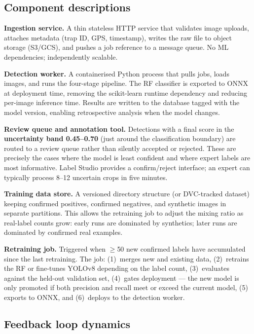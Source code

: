 \documentclass[11pt, a4paper]{article}
\begin{document}
\subsection{Component descriptions}

\textbf{Ingestion service.}
A thin stateless HTTP service that validates image uploads,
attaches metadata (trap ID, GPS, timestamp), writes the raw file to object
storage (S3/GCS), and pushes a job reference to a message queue. No ML
dependencies; independently scalable.

\textbf{Detection worker.}
A containerised Python process that pulls jobs, loads images, and runs the
four-stage pipeline. The RF classifier is exported to ONNX at deployment time,
removing the scikit-learn runtime dependency and reducing per-image inference
time. Results are written to the database tagged with the model version,
enabling retrospective analysis when the model changes.

\textbf{Review queue and annotation tool.}
Detections with a final score in the \textbf{uncertainty band 0.45--0.70}
(just around the classification boundary) are routed to a review queue rather
than silently accepted or rejected. These are precisely the cases where the
model is least confident and where expert labels are most informative. Label
Studio provides a confirm/reject interface; an expert can typically process
8--12 uncertain crops in five minutes. 

\textbf{Training data store.}
A versioned directory structure (or DVC-tracked dataset) keeping confirmed
positives, confirmed negatives, and synthetic images in separate partitions.
This allows the retraining job to adjust the mixing ratio as real-label counts
grow: early runs are dominated by synthetics; later runs are dominated by
confirmed real examples.

\textbf{Retraining job.}
Triggered when $\geq$50 new confirmed labels have accumulated since the last
retraining. The job: (1)~merges new and existing data, (2)~retrains the RF
or fine-tunes YOLOv8 depending on the label count, (3)~evaluates against the
held-out validation set, (4)~gates deployment --- the new model is only
promoted if both precision and recall meet or exceed the current model, (5)~
exports to ONNX, and (6)~deploys to the detection worker.

\subsection{Feedback loop dynamics}
\end{document}
